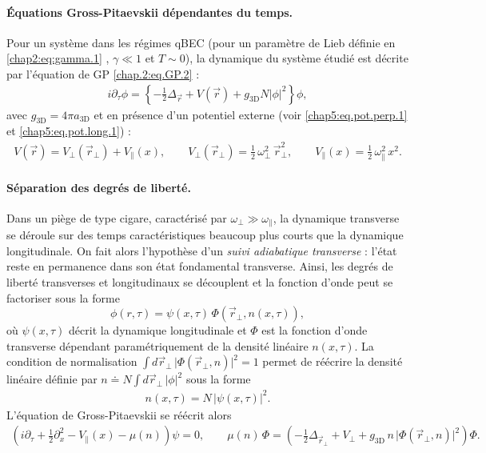 \paragraph{Équations Gross-Pitaevskii dépendantes du temps.}
Pour un système dans les régimes \gls{qBEC} (pour un paramètre de Lieb définie en \ref{chap2:eq:gamma.1} , $\gamma  \ll 1$ et $T \sim 0$), la dynamique du système étudié est décrite par l’équation de \gls{GP} \eqref{chap.2:eq.GP.2} : 
\begin{eqnarray*}
	i \partial_\tau\phi = \left \{ - \frac{1}{2}\Delta_{\vec{r}} + V(\vec{r}) + g_{\mathrm{3D}} N \vert \phi \vert^2 \right \} \phi,
\end{eqnarray*}
avec $g_{\mathrm{3D}} = 4 \pi a_{\mathrm{3D}}$ et en présence d’un potentiel externe (voir \eqref{chap5:eq.pot.perp.1} et \eqref{chap5:eq.pot.long.1}) :
\begin{eqnarray*}
	V(\vec{r}) = V_\perp(\vec{r}_\perp) + V_\parallel(x), 
	\qquad 
	V_\perp(\vec{r}_\perp) = \tfrac{1}{2} \, \omega_\perp^2 \, \vec{r}_\perp^2, 
	\qquad 
	V_\parallel(x) = \tfrac{1}{2} \, \omega_\parallel^2 \, x^2.
\end{eqnarray*} 


\paragraph{Séparation des degrés de liberté.}
Dans un piège de type cigare, caractérisé par $\omega_\perp \gg \omega_\parallel$, la dynamique transverse se déroule sur des temps caractéristiques beaucoup plus courts que la dynamique longitudinale. On fait alors l’hypothèse d’un \emph{suivi adiabatique transverse} : l’état reste en permanence dans son état fondamental transverse. Ainsi, les degrés de liberté transverses et longitudinaux se découplent et la fonction d’onde peut se factoriser sous la forme
\begin{equation}
    \phi(r,\tau) = \psi(x,\tau)\,\Phi\!\left(\vec{r}_\perp, n(x,\tau)\right),
\end{equation}
où $\psi(x,\tau)$ décrit la dynamique longitudinale et $\Phi$ est la fonction d’onde transverse dépendant paramétriquement de la densité linéaire $n(x,\tau)$. La condition de normalisation 
\(
\int d \vec{r}_\perp \, \big|\Phi\!\left(\vec{r}_\perp, n\right)\big|^2 = 1
\)
permet de réécrire la densité linéaire définie par 
\(
n \doteq N \int d \vec{r}_\perp \, |\phi|^2
\)
sous la forme
\begin{eqnarray*}
	n(x,\tau) = N \, |\psi(x,\tau)|^2.
\end{eqnarray*}
L’équation de Gross-Pitaevskii se réécrit alors
\begin{eqnarray}
	\left( i \partial_\tau + \tfrac{1}{2} \partial_x^2 - V_\parallel(x) - \mu(n) \right) \psi = 0, 
	\qquad 
	\mu(n)\,\Phi = \left( - \tfrac{1}{2} \Delta_{\vec{r}_\perp} + V_\perp + g_{\mathrm{3D}} \, n \, \big|\Phi(\vec{r}_\perp,n)\big|^2 \right)\Phi.
\end{eqnarray}

